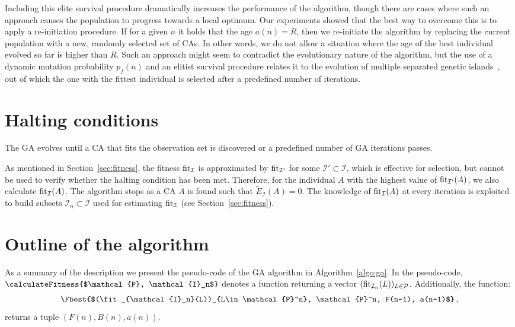 Including this elite survival procedure dramatically increases the performance of the algorithm, though there are cases where such an approach causes the population to progress towards a local optimum. Our experiments showed that the best way to overcome this is to apply a re-initiation procedure. If for a given $n$ it holds that the age $a(n) = R$, then we re-initiate the algorithm by replacing the current population with a new, randomly selected set of CAs. In other words, we do not allow a situation where the age of the best individual evolved so far is higher than $R$. Such an approach might seem to contradict the evolutionary nature of the algorithm, but the use of a dynamic mutation probability $p_f(n)$ and an elitist survival procedure relates it to the evolution of multiple separated genetic islands~\cite{Whitley98theisland}, out of which the one with the fittest individual is selected after a predefined number of iterations.

\section{Halting conditions}\label{sec:halt}
The GA evolves until a CA that fits the observation set is discovered or a predefined number of GA iterations passes.

As mentioned in Section~\ref{sec:fitness}, the fitness $\operatorname{fit}_{\mathcal{I}}$ is approximated by $\operatorname{fit}_{\mathcal{I}'}$ for some $\mathcal{I}'\subset\mathcal{I}$, which is effective for selection, but cannot be used to verify whether the halting condition has been met.
Therefore, for the individual $A$ with the highest value of $\operatorname{fit}_{\mathcal{I}'}(A)$, we also calculate $\operatorname{fit}_{\mathcal{I}}(A)$.
The algorithm stops as a CA $A$ is found such that $\widetilde{E}_\mathcal{I}(A) = 0$. The knowledge of $\operatorname{fit}_\mathcal{I}(A)$ at every iteration is exploited to build subsets $\mathcal{I}_n\subset\mathcal{I}$ used for estimating $\operatorname{fit}_\mathcal{I}$ (see Section~\ref{sec:fitness}).

\section{Outline of the algorithm}
As a summary of the description we present the pseudo-code of the GA algorithm in Algorithm~\ref{algo:ga}. In the pseudo-code, $\calculateFitness{$\mathcal{P}, \mathcal{I}_n$}$ denotes a function returning a vector $(\operatorname{fit}_{\mathcal{I}_n}(L))_{L\in\mathcal{P}}$. Additionally, the function: 
\[\Fbest{$(\fit_{\mathcal{I}_n}(L))_{L\in\mathcal{P}^n}, \mathcal{P}^n, F(n-1), a(n-1)$}\,,\] 
returns a tuple $(F(n), B(n), a(n))$.

